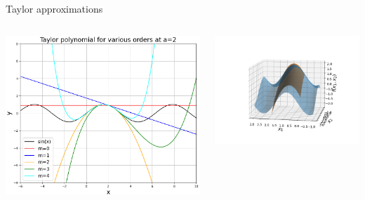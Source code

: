\documentclass[11pt,compress,t,notes=noshow, xcolor=table]{beamer}
\begin{document}
\begin{vbframe}{Taylor approximations}
\begin{columns}
\begin{column}{0.45\textwidth}
\includegraphics[width=\columnwidth]{figure_man/taylor_univariate.png}
\end{column}
\begin{column}{0.55\textwidth}
\includegraphics[width=\columnwidth]{figure_man/Taylor2D/Taylor2D_2nd-100.png}
\end{column}
\end{columns}


\end{vbframe}
\end{document}
